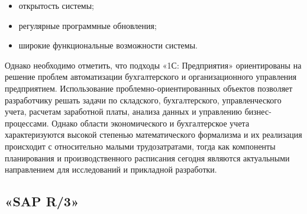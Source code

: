 \begin{itemize}
	\item открытость системы;
	\item регулярные программные обновления;
	\item широкие функциональные возможности системы.
\end{itemize}


\indent Однако необходимо отметить, что подходы «1С: Предприятия» ориентированы на решение проблем автоматизации бухгалтерского и организационного управления предприятием.
Использование проблемно-ориентированных объектов позволяет разработчику решать задачи по складского, бухгалтерского, управленческого учета, расчетам заработной платы, анализа данных и управлению бизнес-процессами. 
Однако области экономического и бухгалтерское учета характеризуются высокой степенью математического формализма и их реализация происходит с относительно малыми трудозатратами, тогда как компоненты планирования и производственного расписания сегодня являются актуальными направлением для исследований и прикладной разработки.

\subsection{«SAP R/3»}

